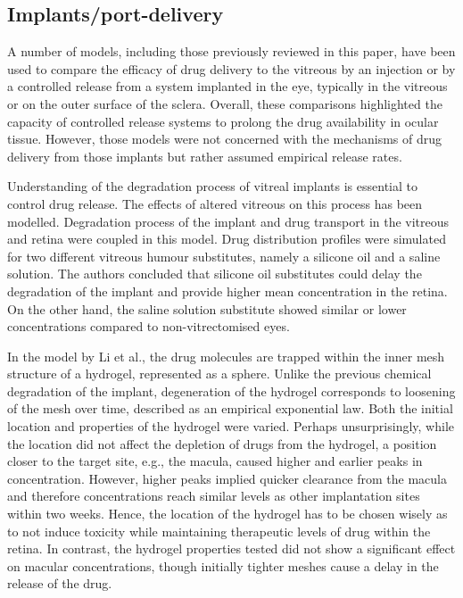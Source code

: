 \documentclass[12pt,a4paper]{journal}
\begin{document}
\subsection*{Implants/port-delivery}

A number of models, including those previously reviewed in this paper, have been used to compare the efficacy of drug delivery to the vitreous by an injection or by a controlled release from a system implanted in the eye, typically in the vitreous or on the outer surface of the sclera.\cite{Jooybar_2014,Kathawate_2008,Kavousanakis_2014,Park_2005}
Overall, these comparisons highlighted the capacity of controlled release systems to prolong the drug availability in ocular tissue.
However, those models were not concerned with the mechanisms of drug delivery from those implants but rather assumed empirical release rates.

Understanding of the degradation process of vitreal implants is essential to control drug release.
The effects of altered vitreous on this process has been modelled.\cite{Ferreira_2020}
Degradation process of the implant and drug transport in the vitreous and retina were coupled in this model.
Drug distribution profiles were simulated for two different vitreous humour substitutes, namely a silicone oil and a saline solution.
The authors concluded that silicone oil substitutes could delay the degradation of the implant and provide higher mean concentration in the retina.
On the other hand, the saline solution substitute showed similar or lower concentrations compared to non-vitrectomised eyes.\cite{Ferreira_2020}

In the model by Li et al., the drug molecules are trapped within the inner mesh structure of a hydrogel, represented as a sphere.\cite{Li_2022}
Unlike the previous chemical degradation of the implant, degeneration of the hydrogel corresponds to loosening of the mesh over time, described as an empirical exponential law.
Both the initial location and properties of the hydrogel were varied.
Perhaps unsurprisingly, while the location did not affect the depletion of drugs from the hydrogel, a position closer to the target site, e.g., the macula, caused higher and earlier peaks in concentration.
However, higher peaks implied quicker clearance from the macula and therefore concentrations reach similar levels as other implantation sites within two weeks.\cite{Li_2022}
Hence, the location of the hydrogel has to be chosen wisely as to not induce toxicity while maintaining therapeutic levels of drug within the retina.
In contrast, the hydrogel properties tested did not show a significant effect on macular concentrations, though initially tighter meshes cause a delay in the release of the drug.
\end{document}
